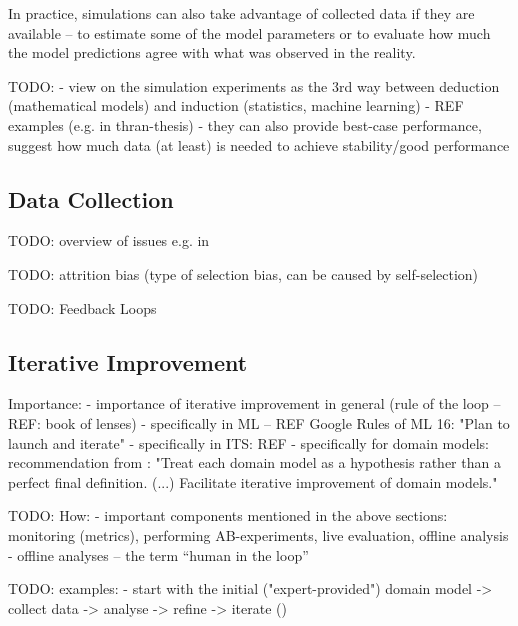 In practice, simulations can also take advantage of collected data
  if they are available -- to estimate some of the model parameters
  or to evaluate how much the model predictions agree with
  what was observed in the reality.


TODO:
- view on the simulation experiments as the 3rd way between deduction (mathematical models) and induction (statistics, machine learning)
- REF examples (e.g. in thran-thesis)
- they can also provide best-case performance, suggest how much data (at least) is needed to achieve stability/good performance



\subsection{Data Collection}

TODO: overview of issues e.g. in \cite{pelanek-learner-modeling}

TODO: attrition bias (type of selection bias, can be caused by self-selection)

TODO: Feedback Loops


\subsection{Iterative Improvement}
\label{sec:iterative-improvement}

Importance:
- importance of iterative improvement in general (rule of the loop -- REF: book of lenses)
- specifically in ML -- REF Google Rules of ML 16: "Plan to launch and iterate"
- specifically in ITS: REF
- specifically for domain models: recommendation from \cite[p.124]{its-domain-models}:
"Treat each domain model as a hypothesis rather than a perfect final definition. (...)
Facilitate iterative improvement of domain models."

TODO: How:
- important components mentioned in the above sections:
  monitoring (metrics), performing AB-experiments, live evaluation, offline
  analysis
- offline analyses -- the term ``human in the loop''
\cite{stupid-tutoring-systems-intelligent-humans}

TODO: examples:
- start with the initial ("expert-provided") domain model -> collect data ->
analyse -> refine -> iterate (\cite[chapter 10]{its-domain-models})


